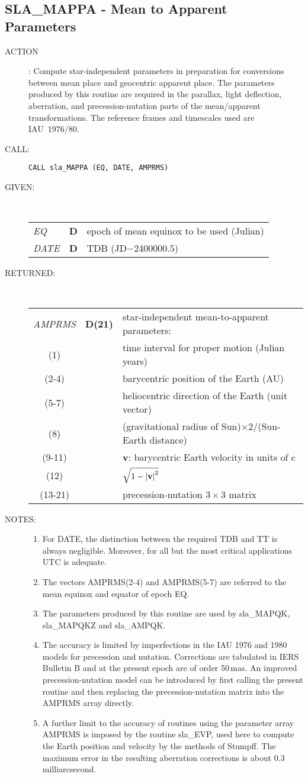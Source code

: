 \documentclass[11pt,twoside]{article}
\newcommand{\xlabel}[1]{}
\newcommand{\routine}[3]
{\hbadness=10000
  \vbox
  {
    \rule{\textwidth}{0.3mm}\\
    {\Large {\bf #1} \hfill #2 \hfill {\bf #1}}\\
    \setlength{\oldspacing}{\topsep}
    \setlength{\topsep}{0.3ex}
    \begin{description}
      #3
    \end{description}
    \setlength{\topsep}{\oldspacing}
  }
}
\renewcommand{\routine}[3]
   {
      \subsection{#1\xlabel{#1} - #2\label{#1}}
       \begin{description}
         #3
       \end{description}
   }
\newcommand{\action}[1]
{\item[ACTION]: #1}
\newcommand{\action}[1]
   {\item[ACTION:] #1}
\newcommand{\call}[1]
{\item[CALL]: \hspace{0.4em}{\tt #1}}
\newlength{\oldspacing}
\renewcommand{\call}[1]
   {
    \item[CALL:] {\tt #1}
   }
\newcommand{\args}[2]
{
  \goodbreak
  \setlength{\oldspacing}{\topsep}
  \setlength{\topsep}{0.3ex}
  \begin{description}
  \item[#1]:\\[1.5ex]
    \begin{tabular}{p{7em}p{6em}p{22em}}
      #2
    \end{tabular}
  \end{description}
  \setlength{\topsep}{\oldspacing}
}
\renewcommand{\args}[2]
   {
     \begin{description}
        \item[#1:]\\
        \begin{tabular}{p{7em}p{6em}l}
           #2
        \end{tabular}
     \end{description}
   }
\newcommand{\spec}[3]
{
  {\em {#1}} & {\bf \mbox{#2}} & {#3}
}
\newcommand{\specel}[2]
{
  \multicolumn{1}{c}{#1} & {} & {#2}
}
\newcommand{\notes}[1]
{
  \goodbreak
  \setlength{\oldspacing}{\topsep}
  \setlength{\topsep}{0.3ex}
  \begin{description}
    \item[NOTES]:
        #1
  \end{description}
  \setlength{\topsep}{\oldspacing}
}
\renewcommand{\notes}[1]
   {
      \begin{description}
         \item[NOTES:]
            #1
      \end{description}
   }
\begin{document}
\routine{SLA\_MAPPA}{Mean to Apparent Parameters}
{
 \action{Compute star-independent parameters in preparation for
         conversions between mean place and geocentric apparent place.
         The parameters produced by this routine are required in the
         parallax, light deflection, aberration, and precession-nutation
         parts of the mean/apparent transformations.
         The reference frames and timescales used are IAU~1976/80.}
 \call{CALL sla\_MAPPA (EQ, DATE, AMPRMS)}
}
\args{GIVEN}
{
 \spec{EQ}{D}{epoch of mean equinox to be used (Julian)} \\
 \spec{DATE}{D}{TDB (JD$-$2400000.5)}
}
\args{RETURNED}
{
 \spec{AMPRMS}{D(21)}{star-independent mean-to-apparent parameters:} \\
 \specel   {(1)}     {time interval for proper motion (Julian years)} \\
 \specel   {(2-4)}   {barycentric position of the Earth (AU)} \\
 \specel   {(5-7)}   {heliocentric direction of the Earth (unit vector)} \\
 \specel   {(8)}     {(gravitational radius of
                      Sun)$\times 2 / $(Sun-Earth distance)} \\
 \specel   {(9-11)}  {{\bf v}: barycentric Earth velocity in units of c} \\
 \specel   {(12)}    {$\sqrt{1-\left|\mbox{\bf v}\right|^2}$} \\
 \specel   {(13-21)} {precession-nutation $3\times3$ matrix}
}
\notes
{
 \begin{enumerate}
  \item For DATE, the distinction between the required TDB and TT
        is always negligible.  Moreover, for all but the most
        critical applications UTC is adequate.
  \item The vectors AMPRMS(2-4) and AMPRMS(5-7) are referred to
        the mean equinox and equator of epoch EQ.
  \item The parameters produced by this routine are used by
        sla\_MAPQK, sla\_MAPQKZ and sla\_AMPQK.
  \item The accuracy is limited by imperfections in the IAU 1976
        and 1980 models for precession and nutation. Corrections
        are tabulated in IERS Bulletin B and at the present epoch
        are of order 50\,mas. An improved precession-nutation model
        can be introduced by first calling the present routine
        and then replacing the precession-nutation
        matrix into the AMPRMS array directly.
  \item A further limit to the accuracy of routines using the
        parameter array AMPRMS is
        imposed by the routine sla\_EVP, used here to compute the
        Earth position and velocity by the methods of Stumpff.
        The maximum error in the resulting aberration corrections is
        about 0.3 milliarcsecond.
 \end{enumerate}
}
\end{document}
